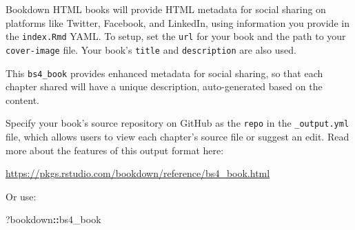 \documentclass[
]{book}
\newenvironment{Shaded}{\begin{snugshade}}{\end{snugshade}}
\newcommand{\NormalTok}[1]{#1}
\newcommand{\SpecialCharTok}[1]{\textcolor[rgb]{0.81,0.36,0.00}{\textbf{#1}}}
\theoremstyle{definition}
\theoremstyle{definition}
\theoremstyle{definition}
\theoremstyle{definition}
\theoremstyle{remark}
\begin{document}
Bookdown HTML books will provide HTML metadata for social sharing on platforms like Twitter, Facebook, and LinkedIn, using information you provide in the \texttt{index.Rmd} YAML. To setup, set the \texttt{url} for your book and the path to your \texttt{cover-image} file. Your book's \texttt{title} and \texttt{description} are also used.

This \texttt{bs4\_book} provides enhanced metadata for social sharing, so that each chapter shared will have a unique description, auto-generated based on the content.

Specify your book's source repository on GitHub as the \texttt{repo} in the \texttt{\_output.yml} file, which allows users to view each chapter's source file or suggest an edit. Read more about the features of this output format here:

\url{https://pkgs.rstudio.com/bookdown/reference/bs4_book.html}

Or use:

\begin{Shaded}
\begin{Highlighting}[]
\NormalTok{?bookdown}\SpecialCharTok{::}\NormalTok{bs4\_book}
\end{Highlighting}
\end{Shaded}


  
\end{document}
